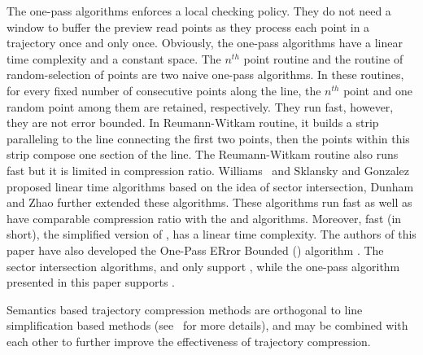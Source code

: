 The one-pass algorithms enforces a local checking policy.
They do not need a window to buffer the preview read points as they process each point in a trajectory once and only once.
Obviously, the one-pass algorithms have a linear time complexity and a constant space.
%
The $n^{th}$ point routine and the routine of random-selection of points \cite{Shi:Survey} are two naive one-pass algorithms.
In these routines, for every fixed number of consecutive points along the line, the $n^{th}$ point and one random point among them are retained, respectively.
They run fast, however, they are not error bounded.
%
In Reumann-Witkam routine\cite{Reumann:Strip}, it builds a strip paralleling to the line connecting the first two points, then the points within this strip compose one section of the line.
The Reumann-Witkam routine also runs fast but it is limited in compression ratio.
%
Williams~\cite{Williams:Longest} and Sklansky and Gonzalez \cite{Sklansky:Cone} proposed linear time algorithms based on the idea of sector intersection, Dunham \cite{Dunham:Cone} and Zhao \cite{Zhao:Sleeve} further extended these algorithms.
These algorithms run fast as well as have comparable compression ratio with the \dpa and \pavlidis algorithms.
%
Moreover, {fast \bqsa \cite{Liu:BQS} (\fbqsa in short), the simplified version of \bqsa, has a linear time complexity.}
%
The authors of this paper have also developed the One-Pass ERror Bounded (\operb) algorithm \cite{Lin:Operb}.
%
The sector intersection algorithms, \fbqsa and \operb only support \ped,
while the one-pass algorithm presented in this paper supports \sed.



Semantics based trajectory compression methods are orthogonal to line simplification based methods (see~\cite{Lin:Operb} for more details), and may be combined with each other to further improve the effectiveness of trajectory compression.

